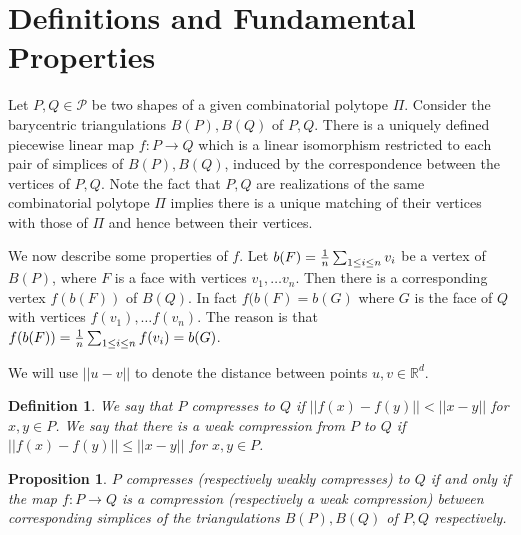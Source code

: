 \documentclass[a4paper, 12pt]{amsart}
\theoremstyle{plain}
\newtheorem{Prop}[Thm]{Proposition}
\newtheorem{Def}[Thm]{Definition}
\begin{document}
\section{Definitions and Fundamental Properties}

 Let $P, Q \in \mathcal P$ be two shapes of a given combinatorial polytope $\Pi$. Consider the barycentric triangulations $B(P), B(Q)$ of $P, Q$. There is a uniquely defined piecewise linear map $f:P \to Q$ which is a linear isomorphism restricted to each pair of simplices of $B(P), B(Q)$, induced by the correspondence between the vertices of $P,Q$. Note the fact that $P,Q$ are realizations of the same combinatorial polytope $\Pi$ implies there is a unique matching of their vertices with those of $\Pi$ and hence between their vertices. 
 
 We now describe some properties of $f$. Let $b(F)= {1 \over n} \sum_{ 1 \le i \le n}  v_i$  be a vertex of $B(P)$, where $F$ is a face with vertices $v_1, \dots v_n$. Then there is a corresponding vertex $f(b(F))$ of $B(Q)$. In fact $f(b(F)=b(G)$ where $G$ is the face of $Q$ with vertices $f(v_1), \dots f(v_n)$. The reason is that $f(b(F))={1 \over n} \sum_{ 1 \le i \le n}  f(v_i) = b(G)$.

 We will use $||u-v||$ to denote the distance between points $u,v \in \mathbb{R}^d$.
 
 \begin{Def} We say that $P$ compresses to $Q$ if $||f(x)-f(y)|| < ||x-y||$ for $x,y \in P$. We say that there is a weak compression from $P$ to $Q$ if $||f(x)-f(y)|| \leq ||x-y||$ for $x,y \in P$.
\end{Def}


\begin{Prop}\label{comptriang}
$P$ compresses (respectively weakly compresses) to $Q$ if and only if the map $f:P \to Q$ is a compression (respectively a weak compression) between corresponding simplices of the triangulations $B(P),B(Q)$ of $P,Q$ respectively. 

\end{Prop}
\end{document}
